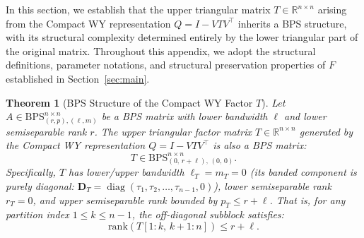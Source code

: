 \documentclass[a4paper,fleqn]{cas-sc}
\newtheorem{mytheorem}{Theorem}
\def\BPS{{\mathrm{BPS}}_{(r,p),(\ell,m)}^{n \times n}}
\DeclareMathOperator{\diag}{diag}
\begin{document}
In this section, we establish that the upper triangular matrix $T \in \mathbb{R}^{n \times n}$ arising from the Compact WY representation $Q = I - V T V^\top$ inherits a BPS structure, with its structural complexity determined entirely by the lower triangular part of the original matrix. Throughout this appendix, we adopt the structural definitions, parameter notations, and structural preservation properties of $F$ established in Section~\ref{sec:main}.

\begin{mytheorem}[BPS Structure of the Compact WY Factor $T$]
Let $A \in \BPS$ be a BPS matrix with lower bandwidth $\ell$ and lower semiseparable rank $r$. The upper triangular factor matrix $T \in \mathbb{R}^{n \times n}$ generated by the Compact WY representation $Q = I - V T V^\top$ is also a BPS matrix:
\[
T \in \mathrm{BPS}_{(0, \, r+\ell), \, (0, \, 0)}^{n \times n}.
\]
Specifically, $T$ has lower/upper bandwidth $\ell_T = m_T = 0$ (its banded component is purely diagonal: $\mathbf{D}_T = \diag(\tau_1, \tau_2, \dots, \tau_{n-1}, 0)$), lower semiseparable rank $r_T = 0$, and upper semiseparable rank bounded by $p_T \le r + \ell$. That is, for any partition index $1 \le k \le n-1$, the off-diagonal subblock satisfies:
\[
\mathrm{rank}\left(T[1:k, \, k+1:n]\right) \le r + \ell.
\]
\end{mytheorem}
\end{document}
